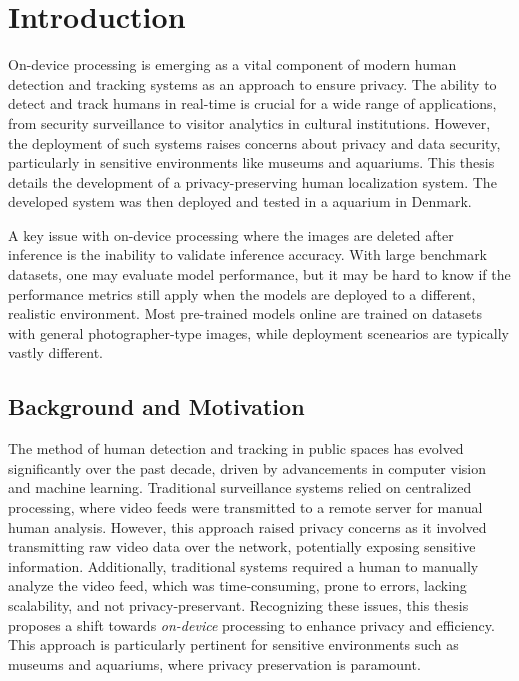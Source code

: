 \section{Introduction}
On-device processing is emerging as a vital component of modern human detection and tracking systems as an approach to ensure privacy. The ability to detect and track humans in real-time is crucial for a wide range of applications, from security surveillance to visitor analytics in cultural institutions. However, the deployment of such systems raises concerns about privacy and data security, particularly in sensitive environments like museums and aquariums. This thesis details the development of a privacy-preserving human localization system. The developed system was then deployed and tested in a aquarium in Denmark. 

A key issue with on-device processing where the images are deleted after inference is the inability to validate inference accuracy. With large benchmark datasets, one may evaluate model performance, but it may be hard to know if the performance metrics still apply when the models are deployed to a different, realistic environment. Most pre-trained models online are trained on datasets with general photographer-type images, while deployment scenearios are typically vastly different. 

\subsection{Background and Motivation}
The method of human detection and tracking in public spaces has evolved significantly over the past decade, driven by advancements in computer vision and machine learning. Traditional surveillance systems relied on centralized processing, where video feeds were transmitted to a remote server for manual human analysis. However, this approach raised privacy concerns as it involved transmitting raw video data over the network, potentially exposing sensitive information. Additionally, traditional systems required a human to manually analyze the video feed, which was time-consuming, prone to errors, lacking scalability, and not privacy-preservant. Recognizing these issues, this thesis proposes a shift towards \textit{on-device} processing to enhance privacy and efficiency. This approach is particularly pertinent for sensitive environments such as museums and aquariums, where privacy preservation is paramount.

